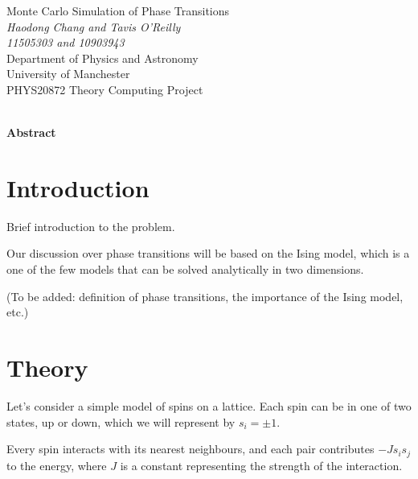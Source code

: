 \documentclass[11pt]{article}
\begin{document}
	
	\begin{titlepage}
		\begin{center}
			{\Huge Monte Carlo Simulation of Phase Transitions}\\[0.5cm]
			\textit{Haodong Chang and Tavis O'Reilly}\\[0.3cm]
			\textit{11505303 and 10903943}\\[0.3cm]
			Department of Physics and Astronomy\\[0.3cm]
			University of Manchester\\[0.3cm]
			PHYS20872 Theory Computing Project\\[0.3cm]
			\shortmonthname[\the\month]  \the\year \\[4cm]
			
		\end{center}
		
		{\Large \textbf{Abstract}}\\[0.3cm]
		
		
	\end{titlepage}
	
	\clearpage
	\setcounter{page}{2}
	
	\newpage
	
	\section{Introduction}
	
	Brief introduction to the problem.

	Our discussion over phase transitions will be based on the Ising model, 
	which is a one of the few models that can be solved analytically in two dimensions.

	(To be added: definition of phase transitions, the importance of the Ising model, etc.)
	
	\section{Theory}

	Let's consider a simple model of spins on a lattice.
	Each spin can be in one of two states, up or down, which we will represent by $s_i = \pm 1$.

	Every spin interacts with its nearest neighbours, and each pair contributes $-J s_i s_j$ to the energy, 
	where $J$ is a constant representing the strength of the interaction.
\end{document}
